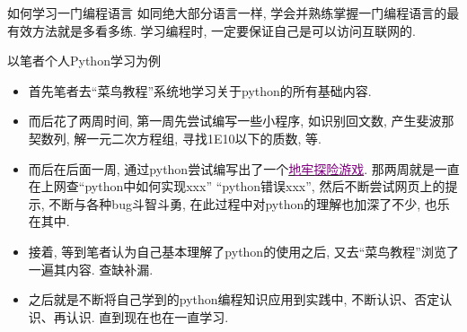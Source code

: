 \documentclass{beamer}
\newcommand{\purple}{\textcolor{purple}}
\begin{document}
    \begin{frame}{如何学习一门编程语言}
      如同绝大部分语言一样, 学会并熟练掌握一门编程语言的最有效方法就是多看多练. 学习编程时, 一定要保证自己是可以访问互联网的.
      \begin{block}{以笔者个人Python学习为例}
        \begin{itemize}
          \item 首先笔者去``菜鸟教程''系统地学习关于python的所有基础内容. 
          \item 而后花了两周时间, 第一周先尝试编写一些小程序, 如识别回文数, 产生斐波那契数列, 解一元二次方程组, 寻找1E10以下的质数, 等. 
          \item 而后在后面一周, 通过python尝试编写出了一个\href{https://github.com/kYangLi/Game-Skyround}{\purple{地牢探险游戏}}. 那两周就是一直在上网查``python中如何实现xxx'' ``python错误xxx'', 然后不断尝试网页上的提示, 不断与各种bug斗智斗勇, 在此过程中对python的理解也加深了不少, 也乐在其中.
          \item 接着, 等到笔者认为自己基本理解了python的使用之后, 又去``菜鸟教程''浏览了一遍其内容. 查缺补漏.
          \item 之后就是不断将自己学到的python编程知识应用到实践中, 不断认识、否定认识、再认识. 直到现在也在一直学习.
        \end{itemize}
      \end{block}
    \end{frame}
\end{document}
